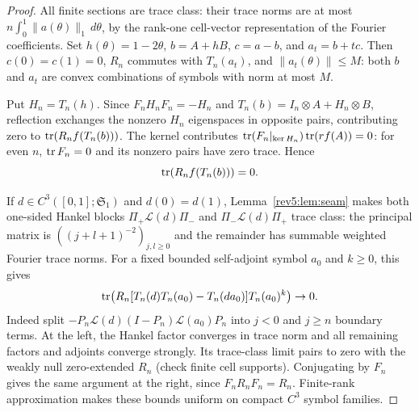 \begin{proof}
All finite sections are trace class: their trace norms are at most
$n\int_0^1\|a(\theta)\|_1\,d\theta$, by the rank-one cell-vector
representation of the Fourier coefficients.  Set
$h(\theta)=1-2\theta$, $b=A+hB$, $c=a-b$, and $a_t=b+tc$.
Then $c(0)=c(1)=0$, $R_n$ commutes with $T_n(a_t)$, and
$\|a_t(\theta)\|\le M$: both $b$ and $a_t$ are convex combinations
of symbols with norm at most $M$.

Put $H_n=T_n(h)$. Since $F_nH_nF_n=-H_n$ and
$T_n(b)=I_n\otimes A+H_n\otimes B$, reflection exchanges the
nonzero $H_n$ eigenspaces in opposite pairs, contributing zero to
$\operatorname{tr}(R_nf(T_n(b)))$. The kernel contributes
$\operatorname{tr}(F_n|_{\ker H_n})\operatorname{tr}(rf(A))=0$: for even $n$,
$\operatorname{tr} F_n=0$ and its nonzero pairs have zero trace. Hence
\begin{equation}\label{ext:eq:linear-reflection-zero}
 \operatorname{tr}(R_nf(T_n(b)))=0.
\end{equation}

If $d\in C^3([0,1];\mathfrak S_1)$ and $d(0)=d(1)$,
Lemma~\ref{rev5:lem:seam} makes both one-sided Hankel blocks
$\Pi_+\mathcal L(d)\Pi_-$ and $\Pi_-\mathcal L(d)\Pi_+$ trace class:
the principal matrix is $((j+l+1)^{-2})_{j,l\ge0}$ and the remainder
has summable weighted Fourier trace norms. For a fixed bounded
self-adjoint symbol $a_0$ and $k\ge0$, this gives
\begin{equation}\label{ext:eq:reflected-boundary-zero}
 \operatorname{tr}\bigl(R_n[T_n(d)T_n(a_0)-T_n(da_0)]T_n(a_0)^k\bigr)\to0.
\end{equation}
Indeed split $-P_n\mathcal L(d)(I-P_n)\mathcal L(a_0)P_n$ into
$j<0$ and $j\ge n$ boundary terms. At the left, the Hankel factor
converges in trace norm and all remaining factors and adjoints converge
strongly. Its trace-class limit pairs to zero with the weakly null
zero-extended $R_n$ (check finite cell supports). Conjugating by $F_n$
gives the same argument at the right, since $F_nR_nF_n=R_n$.
Finite-rank approximation makes these bounds uniform on compact
$C^3$ symbol families.


\end{proof}
